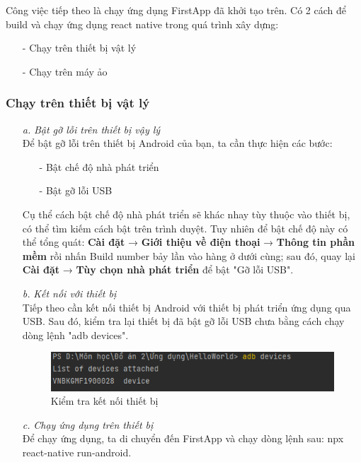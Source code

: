 Công việc tiếp theo là chạy ứng dụng FirstApp đã khởi tạo trên. Có 2 cách để build và chạy ứng dụng react native trong quá trình xây dựng:
\begin{enumerate}
    \item[-] Chạy trên thiết bị vật lý
    \item[-] Chạy trên máy ảo
\end{enumerate}

\subsubsection{Chạy trên thiết bị vật lý}
\begin{enumerate}
    \item[\textit{a.}] {\textit{Bật gỡ lỗi trên thiết bị vậy lý}}\\
    Để bật gỡ lỗi trên thiết bị Android của bạn, ta cần thực hiện các bước:
    \begin{enumerate}
        \item[-] Bật chế độ nhà phát triển
        \item[-] Bật gỡ lỗi USB
    \end{enumerate}
    Cụ thể cách bật chế độ nhà phát triển sẽ khác nhay tùy thuộc vào thiết bị, có thể tìm kiếm cách bật trên trình duyệt. Tuy nhiên để bật chế độ này có thể tổng quát: \textbf{Cài đặt} → \textbf{Giới thiệu về điện thoại} → \textbf{Thông tin phần mềm} rồi nhấn Build number bảy lần vào hàng ở dưới cùng; sau đó, quay lại \textbf{Cài đặt} → \textbf{Tùy chọn nhà phát triển} để bật "Gỡ lỗi USB".
    \item[\textit{b.}] {\textit{Kết nối với thiết bị}}\\
    Tiếp theo cần kết nối thiết bị Android với thiết bị phát triển ứng dụng qua USB. Sau đó, kiểm tra lại thiết bị đã bật gỡ lỗi USB chưa bằng cách chạy dòng lệnh "adb devices".
    \begin{figure}[!ht]
        \centering
        \includegraphics[width=1\textwidth]{images/checkDevices.png}
        \caption{Kiểm tra kết nối thiết bị}
    \end{figure}
    \item[\textit{c.}] {\textit{Chạy ứng dụng trên thiết bị}}\\
    Để chạy ứng dụng, ta di chuyển đến FirstApp và chạy dòng lệnh sau: npx react-native run-android.
\end{enumerate}
